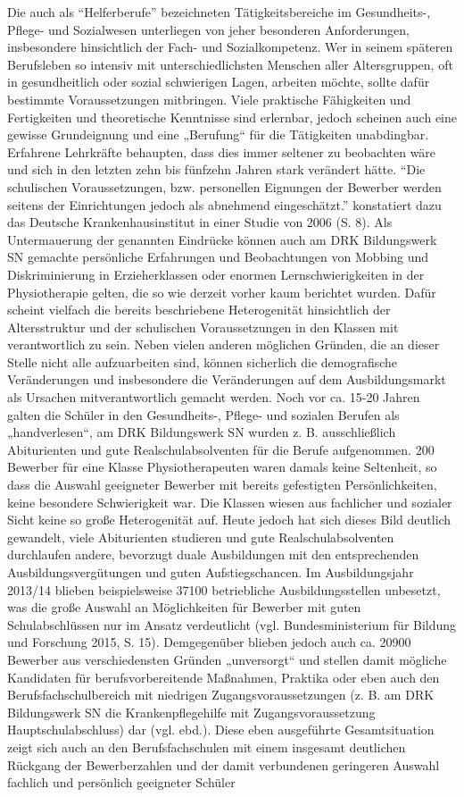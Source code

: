 Die auch als "`Helferberufe"' bezeichneten Tätigkeitsbereiche im Gesundheits-, Pflege- und Sozialwesen unterliegen von jeher besonderen Anforderungen, insbesondere hinsichtlich der Fach- und Sozialkompetenz. Wer in seinem späteren Berufsleben so intensiv mit unterschiedlichsten Menschen aller Altersgruppen, oft in gesundheitlich oder sozial schwierigen Lagen, arbeiten möchte, sollte dafür bestimmte Voraussetzungen mitbringen. Viele praktische Fähigkeiten und Fertigkeiten und theoretische Kenntnisse sind erlernbar, jedoch scheinen auch eine gewisse Grundeignung und eine „Berufung“ für die Tätigkeiten unabdingbar. Erfahrene Lehrkräfte behaupten, dass dies immer seltener zu beobachten wäre und sich in den letzten zehn bis fünfzehn Jahren stark verändert hätte. "`Die schulischen Voraussetzungen, bzw. personellen Eignungen der Bewerber werden seitens der Einrichtungen jedoch als  abnehmend eingeschätzt."' konstatiert dazu das Deutsche Krankenhausinstitut in einer Studie von 2006 (S. 8). Als Untermauerung der genannten Eindrücke können auch am DRK Bildungswerk SN gemachte persönliche Erfahrungen und Beobachtungen von Mobbing und Diskriminierung in Erzieherklassen oder enormen Lernschwierigkeiten in der Physiotherapie gelten, die so wie derzeit vorher kaum berichtet wurden. Dafür scheint vielfach die bereits beschriebene Heterogenität hinsichtlich der Altersstruktur und der schulischen Voraussetzungen in den Klassen mit verantwortlich zu sein. Neben vielen anderen möglichen Gründen, die an dieser Stelle nicht alle aufzuarbeiten sind, können sicherlich die demografische Veränderungen und insbesondere die Veränderungen  auf dem Ausbildungsmarkt als Ursachen mitverantwortlich gemacht werden. Noch vor ca. 15-20 Jahren galten die Schüler in den Gesundheits-, Pflege- und sozialen Berufen als „handverlesen“, am DRK Bildungswerk SN wurden z. B. ausschließlich Abiturienten und gute Realschulabsolventen für die Berufe aufgenommen. 200 Bewerber für eine Klasse Physiotherapeuten waren damals keine Seltenheit, so dass die Auswahl geeigneter Bewerber mit bereits gefestigten Persönlichkeiten, keine besondere Schwierigkeit war. Die Klassen wiesen aus fachlicher und sozialer Sicht keine so große Heterogenität auf.  Heute jedoch hat sich dieses Bild deutlich gewandelt, viele Abiturienten studieren und  gute Realschulabsolventen durchlaufen andere, bevorzugt duale Ausbildungen mit den entsprechenden Ausbildungsvergütungen und guten Aufstiegschancen. Im Ausbildungsjahr 2013/14 blieben beispielsweise 37100 betriebliche Ausbildungsstellen unbesetzt, was die große Auswahl an Möglichkeiten für Bewerber mit guten Schulabschlüssen nur im Ansatz verdeutlicht (vgl. Bundesministerium für Bildung und Forschung 2015, S. 15). Demgegenüber blieben jedoch auch ca. 20900 Bewerber aus verschiedensten Gründen „unversorgt“ und stellen damit mögliche Kandidaten für berufsvorbereitende Maßnahmen, Praktika oder eben auch den Berufsfachschulbereich mit niedrigen Zugangsvoraussetzungen (z. B. am DRK Bildungswerk SN die Krankenpflegehilfe mit Zugangsvoraussetzung Hauptschulabschluss) dar (vgl. ebd.). Diese eben ausgeführte Gesamtsituation zeigt sich auch an den Berufsfachschulen mit einem insgesamt deutlichen Rückgang der Bewerberzahlen und der damit verbundenen geringeren Auswahl fachlich und persönlich geeigneter Schüler 